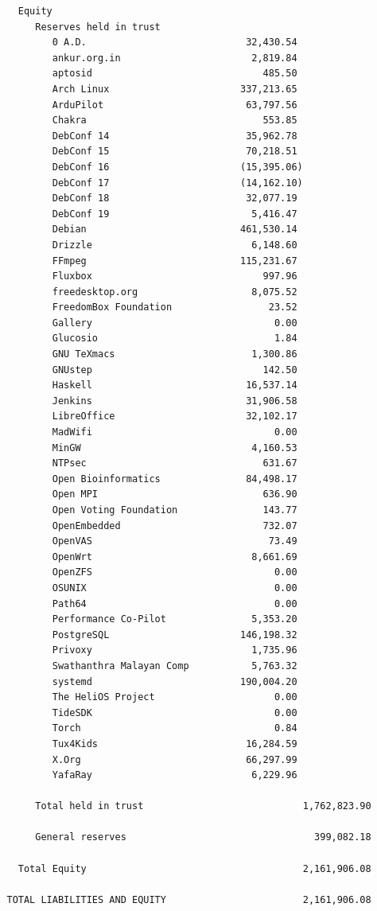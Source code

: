 \documentclass[a4paper]{report}
\begin{document}
\begin{verbatim}
     Equity
        Reserves held in trust
           0 A.D.                            32,430.54
           ankur.org.in                       2,819.84
           aptosid                              485.50
           Arch Linux                       337,213.65
           ArduPilot                         63,797.56
           Chakra                               553.85
           DebConf 14                        35,962.78
           DebConf 15                        70,218.51
           DebConf 16                       (15,395.06)
           DebConf 17                       (14,162.10)
           DebConf 18                        32,077.19
           DebConf 19                         5,416.47
           Debian                           461,530.14
           Drizzle                            6,148.60
           FFmpeg                           115,231.67
           Fluxbox                              997.96
           freedesktop.org                    8,075.52
           FreedomBox Foundation                 23.52
           Gallery                                0.00
           Glucosio                               1.84
           GNU TeXmacs                        1,300.86
           GNUstep                              142.50
           Haskell                           16,537.14
           Jenkins                           31,906.58
           LibreOffice                       32,102.17
           MadWifi                                0.00
           MinGW                              4,160.53
           NTPsec                               631.67
           Open Bioinformatics               84,498.17
           Open MPI                             636.90
           Open Voting Foundation               143.77
           OpenEmbedded                         732.07
           OpenVAS                               73.49
           OpenWrt                            8,661.69
           OpenZFS                                0.00
           OSUNIX                                 0.00
           Path64                                 0.00
           Performance Co-Pilot               5,353.20
           PostgreSQL                       146,198.32
           Privoxy                            1,735.96
           Swathanthra Malayan Comp           5,763.32
           systemd                          190,004.20
           The HeliOS Project                     0.00
           TideSDK                                0.00
           Torch                                  0.84
           Tux4Kids                          16,284.59
           X.Org                             66,297.99
           YafaRay                            6,229.96

        Total held in trust                            1,762,823.90

        General reserves                                 399,082.18

     Total Equity                                      2,161,906.08

   TOTAL LIABILITIES AND EQUITY                        2,161,906.08
\end{verbatim}
\end{document}
